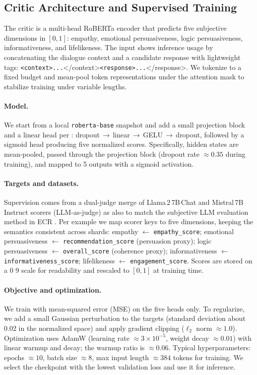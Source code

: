 \documentclass[12pt]{article}
\begin{document}
  \subsection{Critic Architecture and Supervised Training}
  The critic is a multi-head RoBERTa encoder that predicts five subjective dimensions in \([0,1]\): empathy, emotional persuasiveness, logic persuasiveness, informativeness, and lifelikeness. The input shows inference usage by concatenating the dialogue context and a candidate response with lightweight tags: \texttt{<context>...}</context>\texttt{<response>...}</response>. We tokenize to a fixed budget and mean-pool token representations under the attention mask to stabilize training under variable lengths.
  
  \paragraph{Model.} We start from a local \texttt{roberta-base} snapshot and add a small projection block and a linear head per \citep{devlin2018bert,vaswani2017attention}: dropout\,\(\to\)\,linear\,\(\to\)\,GELU\,\(\to\)\,dropout, followed by a sigmoid head producing five normalized scores. Specifically, hidden states are mean-pooled, passed through the projection block (dropout rate \(\approx 0.35\) during training), and mapped to 5 outputs with a sigmoid activation.
  
  \paragraph{Targets and datasets.} Supervision comes from a dual-judge merge of Llama\,2\,7B\,Chat and Mistral\,7B\,Instruct scorers (LLM-as-judge) \citep{yan2023llmjudge} as also to match the subjective LLM evaluation method in ECR \citep{zhang2024ecr}. Per example we map scorer keys to five dimensions, keeping the semantics consistent across shards: empathy \(\leftarrow\) \texttt{empathy\_score}; emotional persuasiveness \(\leftarrow\) \texttt{recommendation\_score} (persuasion proxy); logic persuasiveness \(\leftarrow\) \texttt{overall\_score} (coherence proxy); informativeness \(\leftarrow\) \texttt{informativeness\_score}; lifelikeness \(\leftarrow\) \texttt{engagement\_score}. Scores are stored on a 0\,\textendash\,9 scale for readability and rescaled to \([0,1]\) at training time.
  
  \paragraph{Objective and optimization.} We train with mean-squared error (MSE) on the five heads only. To regularize, we add a small Gaussian perturbation to the targets (standard deviation about 0.02 in the normalized space) and apply gradient clipping (\(\ell_2\) norm \(\approx 1.0\)). Optimization uses AdamW (learning rate \(\approx 3\times 10^{-5}\), weight decay \(\approx 0.01\)) with linear warmup and decay; the warmup ratio is \(\approx 0.06\). Typical hyperparameters: epochs \(\approx 10\), batch size \(\approx 8\), max input length \(\approx 384\) tokens for training. We select the checkpoint with the lowest validation loss and use it for inference.
  
\end{document}
